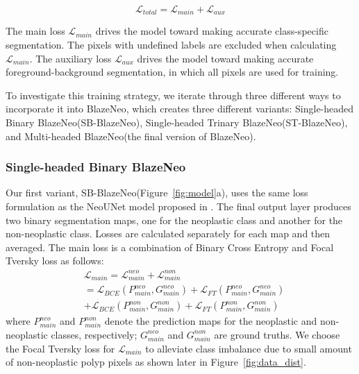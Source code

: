 \documentclass{ieeeaccess}
\newcommand{\ModelName}{BlazeNeo\xspace}
\begin{document}
\begin{equation}
    \label{eq:total_loss}
    \mathcal{L}_{total} =  \mathcal{L}_{main} + \mathcal{L}_{aux}
\end{equation}

The main loss $\mathcal{L}_{main}$ drives the model toward making accurate class-specific segmentation. The pixels with undefined labels are excluded when calculating $\mathcal{L}_{main}$. The auxiliary loss $\mathcal{L}_{aux}$ drives the model toward making accurate foreground-background segmentation, in which all pixels are used for training.

To investigate this training strategy, we iterate through three different ways to incorporate it into \ModelName, which creates three different variants: Single-headed Binary \ModelName (SB-\ModelName), Single-headed Trinary \ModelName (ST-\ModelName), and Multi-headed \ModelName (the final version of \ModelName).

\subsubsection{Single-headed Binary \ModelName}
Our first variant, SB-\ModelName (Figure~\ref{fig:model}a), uses the same loss formulation as the NeoUNet model proposed in \cite{lan2021neounet}. The final output layer produces two binary segmentation maps, one for the neoplastic class and another for the non-neoplastic class. Losses are calculated separately for each map and then averaged. The main loss is a combination of Binary Cross Entropy and Focal Tversky loss \cite{abraham2019novel} as follows:
\begin{align}
     & \mathcal{L}_{main} = \mathcal{L}_{main}^{neo} + \mathcal{L}_{main}^{non} \nonumber                               \\
     & = \mathcal{L}_{BCE}(P_{main}^{neo}, G_{main}^{neo}) + \mathcal{L}_{FT}(P_{main}^{neo}, G_{main}^{neo}) \nonumber \\
     & +  \mathcal{L}_{BCE}(P_{main}^{non}, G_{main}^{non}) + \mathcal{L}_{FT}(P_{main}^{non}, G_{main}^{non})
    \label{eq:main_loss_sb}
\end{align}
where $P_{main}^{neo}$ and $P_{main}^{non}$ denote the prediction maps for the neoplastic and non-neoplastic classes, respectively; $G_{main}^{neo}$ and $G_{main}^{non}$ are ground truths. We choose the Focal Tversky loss for $\mathcal{L}_{main}$ to alleviate class imbalance due to small amount of non-neoplastic polyp pixels as shown later in Figure~\ref{fig:data_dist}.
\end{document}
